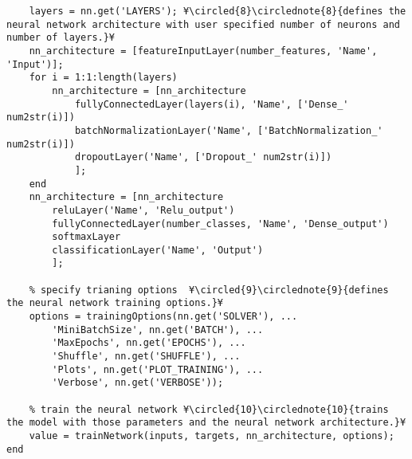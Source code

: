 \documentclass{tufte-handout}
\begin{document}
\begin{lstlisting}
    layers = nn.get('LAYERS'); ¥\circled{8}\circlednote{8}{defines the neural network architecture with user specified number of neurons and number of layers.}¥
    nn_architecture = [featureInputLayer(number_features, 'Name', 'Input')];
    for i = 1:1:length(layers)
        nn_architecture = [nn_architecture
            fullyConnectedLayer(layers(i), 'Name', ['Dense_' num2str(i)])
            batchNormalizationLayer('Name', ['BatchNormalization_' num2str(i)])
            dropoutLayer('Name', ['Dropout_' num2str(i)])
            ];
    end
    nn_architecture = [nn_architecture
        reluLayer('Name', 'Relu_output')
        fullyConnectedLayer(number_classes, 'Name', 'Dense_output')
        softmaxLayer
        classificationLayer('Name', 'Output')
        ];

    % specify trianing options  ¥\circled{9}\circlednote{9}{defines the neural network training options.}¥
    options = trainingOptions(nn.get('SOLVER'), ...
        'MiniBatchSize', nn.get('BATCH'), ...
        'MaxEpochs', nn.get('EPOCHS'), ...
        'Shuffle', nn.get('SHUFFLE'), ...
        'Plots', nn.get('PLOT_TRAINING'), ...
        'Verbose', nn.get('VERBOSE'));

    % train the neural network ¥\circled{10}\circlednote{10}{trains the model with those parameters and the neural network architecture.}¥
    value = trainNetwork(inputs, targets, nn_architecture, options);
end


\end{lstlisting}
\end{document}
